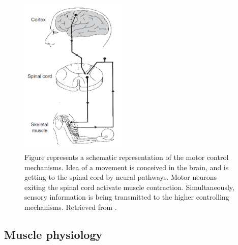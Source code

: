 \begin{figure}[htb!]
\centering
\includegraphics[width=0.45\textwidth]{Images/introduction/control-merletti2.png}
\caption{Figure represents a schematic representation of the motor control mechanisms. Idea of a movement is conceived in the brain, and is getting to the spinal cord by neural pathways. Motor neurons exiting the spinal cord activate muscle contraction. Simultaneously, sensory information is being transmitted to the higher controlling mechanisms. Retrieved from \citet{Merletti-book}.}
\label{fig:control-merletti}
\end{figure}


\subsection{Muscle physiology}


